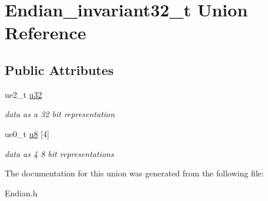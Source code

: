 \hypertarget{union_endian__invariant32__t}{}\section{Endian\+\_\+invariant32\+\_\+t Union Reference}
\label{union_endian__invariant32__t}
\subsection*{Public Attributes}
\begin{DoxyCompactItemize}
\item 
\hypertarget{union_endian__invariant32__t_a784127cdb901408682dac3f36808845a}{}ue2\+\_\+t \hyperlink{union_endian__invariant32__t_a784127cdb901408682dac3f36808845a}{u32}\label{union_endian__invariant32__t_a784127cdb901408682dac3f36808845a}

\begin{DoxyCompactList}\small\item\em data as a 32 bit representation \end{DoxyCompactList}\item 
\hypertarget{union_endian__invariant32__t_ada459fdec7e2170806c48997490870ad}{}ue0\+\_\+t \hyperlink{union_endian__invariant32__t_ada459fdec7e2170806c48997490870ad}{u8} \mbox{[}4\mbox{]}\label{union_endian__invariant32__t_ada459fdec7e2170806c48997490870ad}

\begin{DoxyCompactList}\small\item\em data as 4 8 bit representations \end{DoxyCompactList}\end{DoxyCompactItemize}


The documentation for this union was generated from the following file\+:\begin{DoxyCompactItemize}
\item 
Endian.\+h\end{DoxyCompactItemize}
